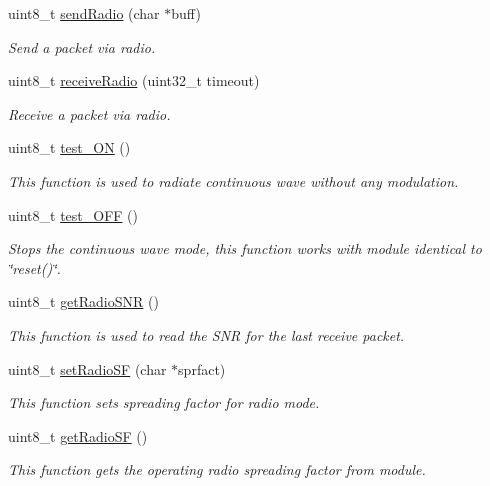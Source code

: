\begin{DoxyCompactItemize}
uint8\+\_\+t \hyperlink{class_wasp_lo_ra_w_a_n_a4709b7d46412f7d3c6e08c774fb27e79}{send\+Radio} (char $\ast$buff)
\begin{DoxyCompactList}\small\item\em Send a packet via radio. \end{DoxyCompactList}\item 
uint8\+\_\+t \hyperlink{class_wasp_lo_ra_w_a_n_a44fecfcdfa1bf3b2da520032c2657ed4}{receive\+Radio} (uint32\+\_\+t timeout)
\begin{DoxyCompactList}\small\item\em Receive a packet via radio. \end{DoxyCompactList}\item 
uint8\+\_\+t \hyperlink{class_wasp_lo_ra_w_a_n_af38a2f1e064c7f5cfeb5b649f1e08933}{test\+\_\+\+ON} ()
\begin{DoxyCompactList}\small\item\em This function is used to radiate continuous wave without any modulation. \end{DoxyCompactList}\item 
uint8\+\_\+t \hyperlink{class_wasp_lo_ra_w_a_n_abce067423ebddb2c08659fab3aacb197}{test\+\_\+\+O\+FF} ()
\begin{DoxyCompactList}\small\item\em Stops the continuous wave mode, this function works with module identical to \char`\"{}reset()\char`\"{}. \end{DoxyCompactList}\item 
uint8\+\_\+t \hyperlink{class_wasp_lo_ra_w_a_n_a939771a7592fc8e06297f40eeb452aa7}{get\+Radio\+S\+NR} ()
\begin{DoxyCompactList}\small\item\em This function is used to read the S\+NR for the last receive packet. \end{DoxyCompactList}\item 
uint8\+\_\+t \hyperlink{class_wasp_lo_ra_w_a_n_a44d315882f2299e748686065bd923522}{set\+Radio\+SF} (char $\ast$sprfact)
\begin{DoxyCompactList}\small\item\em This function sets spreading factor for radio mode. \end{DoxyCompactList}\item 
uint8\+\_\+t \hyperlink{class_wasp_lo_ra_w_a_n_a0c7e50411d1689dadb289588bca4e6cf}{get\+Radio\+SF} ()
\begin{DoxyCompactList}\small\item\em This function gets the operating radio spreading factor from module. \end{DoxyCompactList}\item 

\end{DoxyCompactItemize}
